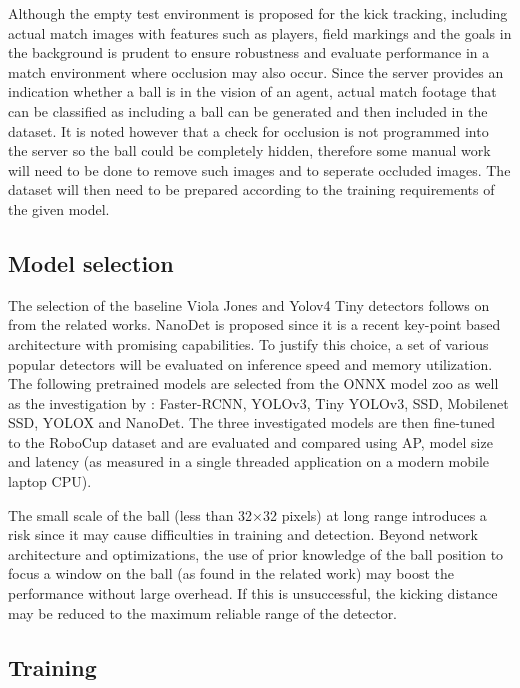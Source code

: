 \documentclass[a4paper,twoside,12pt]{report}
\begin{document}
Although the empty test environment is proposed for the kick tracking, including actual match images with features such as players, field markings and the goals in the background is prudent to ensure robustness and evaluate performance in a match environment where occlusion may also occur. Since the server provides an indication whether a ball is in the vision of an agent, actual match footage that can be classified as including a ball can be generated and then included in the dataset. It is noted however that a check for occlusion is not programmed into the server so the ball could be completely hidden, therefore some manual work will need to be done to remove such images and to seperate occluded images. The dataset will then need to be prepared according to the training requirements of the given model.

\subsection{Model selection}

The selection of the baseline Viola Jones and Yolov4 Tiny detectors follows on from the related works. NanoDet is proposed since it is a recent key-point based architecture with promising capabilities. To justify this choice, a set of various popular detectors will be evaluated on inference speed and memory utilization. The following pretrained models are selected from the ONNX model zoo \citep{modelzoo} as well as the investigation by \cite{comprehensive}: Faster-RCNN, YOLOv3, Tiny YOLOv3, SSD, Mobilenet SSD, YOLOX and NanoDet. The three investigated models are then fine-tuned to the RoboCup dataset and are evaluated and compared using AP, model size and latency (as measured in a single threaded application on a modern mobile laptop CPU).

The small scale of the ball (less than 32×32 pixels) at long range introduces a risk since it may cause difficulties in training and detection. Beyond network architecture and optimizations, the use of prior knowledge of the ball position to focus a window on the ball (as found in the related work) may boost the performance without large overhead. If this is unsuccessful, the kicking distance may be reduced to the maximum reliable range of the detector.

\subsection{Training}
\end{document}
